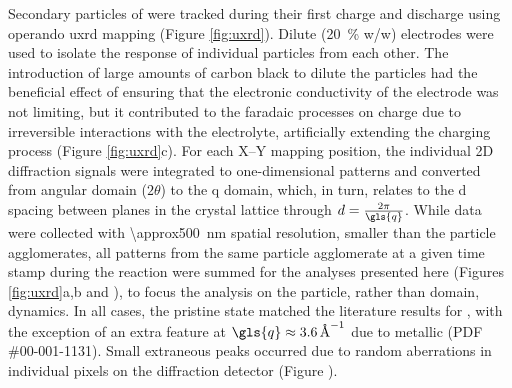 \documentclass{article}
\begin{document}

Secondary particles of \nca{} were tracked during their first charge
and discharge using operando \gls{uxrd} mapping (Figure
\ref{fig:uxrd}). Dilute (\SI{20}{\percent} w/w) \nca{} electrodes were
used to isolate the response of individual particles from each
other. The introduction of large amounts of carbon black to dilute the
particles had the beneficial effect of ensuring that the electronic
conductivity of the electrode was not limiting, but it contributed to
the faradaic processes on charge due to irreversible interactions with
the electrolyte\cite{kostecki2014}, artificially extending the
charging process (Figure \ref{fig:uxrd}c). For each X--Y mapping
position, the individual 2D diffraction signals were integrated to
one-dimensional patterns and converted from angular domain ($2\theta$)
to the \gls{q} domain, which, in turn, relates to the \gls{d} spacing
between planes in the crystal lattice through
$d=\frac{2\pi}{\gls{q}}$. While data were collected with
\SI{\approx500}{\nano\meter} spatial resolution, smaller than the
particle agglomerates, all patterns from the same particle agglomerate
at a given time stamp during the reaction were summed for the analyses
presented here (Figures \ref{fig:uxrd}a,b and
), to focus the analysis on the particle,
rather than domain, dynamics. In all cases, the pristine state matched
the literature results for \nca{} \cite{novak2015}, with the exception
of an extra feature at $\gls{q}\approx\SI{3.6}{\per\angstrom}$ due to
metallic  (PDF \#00-001-1131). Small extraneous peaks occurred
due to random aberrations in individual pixels on the diffraction
detector (Figure ).
\end{document}
